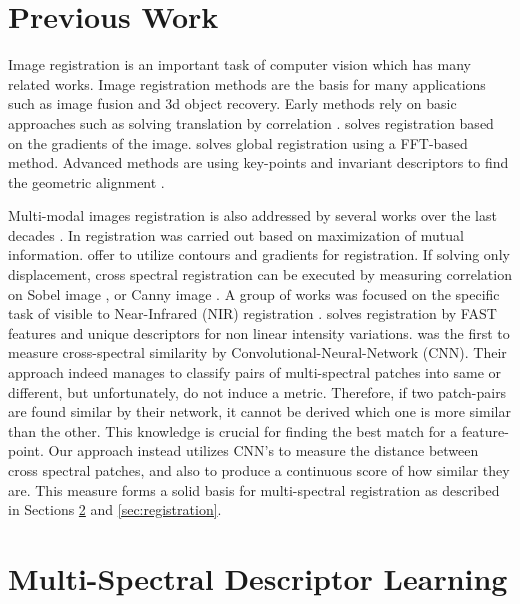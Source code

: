 \documentclass[10pt,twocolumn,letterpaper]{article}
\begin{document}
\section{Previous Work} \label{sec:previous}

Image registration is an important task of computer vision which has many related works. Image registration methods \cite{survey,zitovaSurvey} are the basis for many applications such as image fusion and 3d object recovery. Early methods rely on basic approaches such as solving translation by correlation \cite{correlation}. \cite{lucas1981iterative} solves registration based on the gradients of the image. \cite{reddy1996fft} solves global registration using a FFT-based method. Advanced methods are using key-points \cite{harris,SIFT} and invariant descriptors to find the geometric alignment \cite{SIFT_Registration}.

Multi-modal images registration is also addressed by several works over the last decades \cite{chen2015sirf,shen2014multi}. In \cite{mutualInformaion} registration was carried out based on maximization of mutual information. \cite{multiSpectralSIFT,irani1998robust,keller2006multisensor,li1995contour} offer to utilize contours and gradients for registration. If solving only displacement, cross spectral registration can be executed by measuring correlation on Sobel image \cite{sobel}, or Canny image \cite{Canny}. A group of works was focused on the specific task of visible to Near-Infrared (NIR) registration \cite{multiSpectralSIFT,keller2006multisensor}.  \cite{lghd2015} solves registration by FAST features \cite{takacs2010unified} and unique descriptors for non linear intensity variations. \cite{aguilera2016learning} was the first to measure cross-spectral similarity by Convolutional-Neural-Network (CNN). Their approach indeed manages to classify pairs of multi-spectral patches into same or different, but unfortunately, do not induce a metric. Therefore, if two patch-pairs are found similar by their network, it cannot be derived which one is more similar than the other. This knowledge is crucial for finding the best match for a feature-point. Our approach instead utilizes CNN's to measure the distance between cross spectral patches, and also to produce a continuous score of how similar they are. This measure forms a solid basis for multi-spectral registration as described in Sections \ref{sec:descriptor} and \ref{sec:registration}.

\section{Multi-Spectral Descriptor Learning} \label{sec:descriptor}
\end{document}
